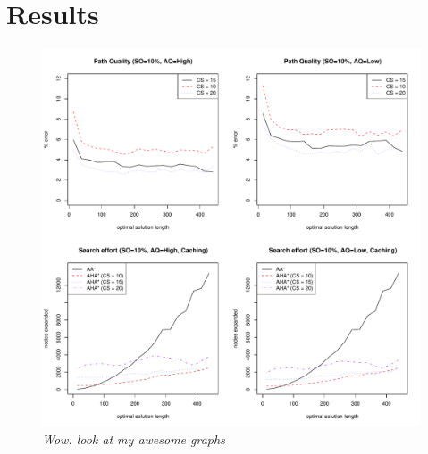 \section{Results}
\begin{figure}[htbp]
       \caption{\emph{ Wow. look at my awesome graphs} }
       \begin{center}
                       \includegraphics[scale=0.35]{diagrams/allgraphs.pdf}
       \end{center}
       \label{aha-fig:allgraphs}
\end{figure}





